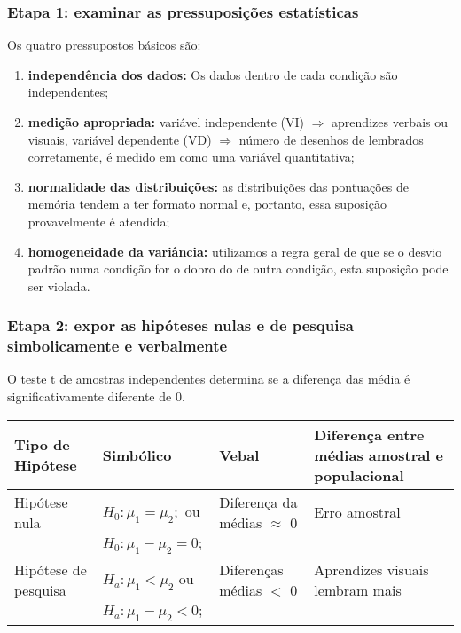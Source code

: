 \documentclass[11pt]{beamer}
\begin{document}
\begin{frame}
\frametitle{Etapa 1: examinar as pressuposições estatísticas}

Os quatro pressupostos básicos são:

\begin{enumerate}
\item \textbf{independência dos dados:} Os dados dentro de cada condição são independentes;
\item \textbf{medição apropriada:} variável independente (VI) \(\Rightarrow\) aprendizes verbais ou visuais, variável dependente (VD) \(\Rightarrow\) número de desenhos de lembrados corretamente, é medido em como uma variável quantitativa;
\item \textbf{normalidade das distribuições:} as distribuições das pontuações de memória tendem a ter formato normal e, portanto, essa suposição provavelmente é atendida;
\item \textbf{homogeneidade da variância:} utilizamos a regra geral de que se o desvio padrão numa condição for o dobro do de outra condição, esta suposição pode ser violada.
\end{enumerate}

\end{frame}

\begin{frame}
\frametitle{Etapa 2: expor as hipóteses nulas e de pesquisa simbolicamente e verbalmente}

O teste t de amostras independentes determina se a diferença das média é significativamente diferente de 0.

\begin{center}
\begin{tabular}{ m{2cm}|m{3cm}|m{2cm}|m{3cm} } 
 \hline
 Tipo de Hipótese & Simbólico & Vebal & Diferença entre médias amostral e populacional\\
  \hline
 Hipótese nula & $H_0:\mu_1=\mu_2;$ ou & Diferença da médias $\approx$ 0 & Erro amostral \\
 & $H_0:\mu_1-\mu_2=0;$ & &\\
 Hipótese de pesquisa & $H_a:\mu_1 < \mu_2$ ou & Diferenças médias $<$ 0 & Aprendizes visuais lembram mais  \\ 
  & $H_a:\mu_1-\mu_2 < 0;$ & &\\
 \hline
 \hline
\end{tabular}
\end{center}

\end{frame}
\end{document}
